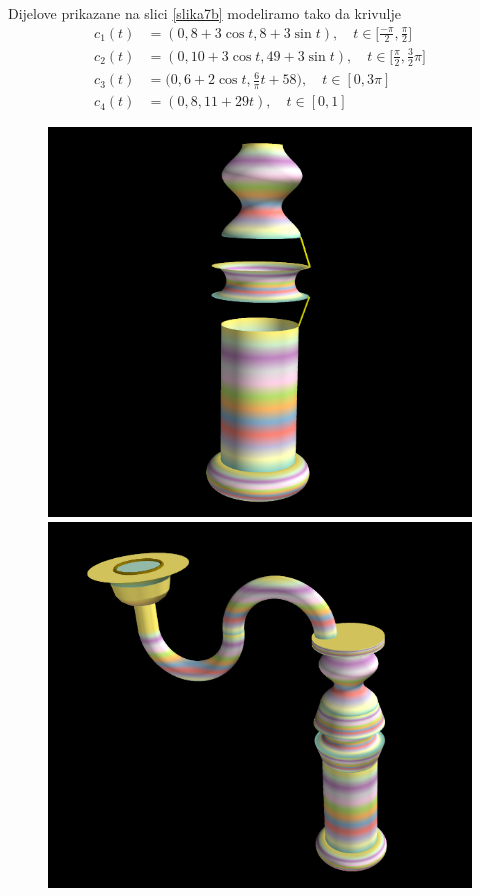 \documentclass[a4paper,12pt]{article}
\theoremstyle{zad}
\begin{document}
Dijelove prikazane na slici \ref{slika7b} modeliramo tako da krivulje
\begin{align*}
c_1(t)&=(0,8+3\cos{t},8+3\sin{t}),\quad t\in\big[\tfrac{-\pi}{2},\tfrac{\pi}{2}\big]\\[5pt]
c_2(t)&=(0,10+3\cos{t},49+3\sin{t}),\quad t\in\big[\tfrac{\pi}{2},\tfrac{3}{2}\pi\big]\\[5pt]
c_3(t)&=\big(0,6+2\cos{t},\tfrac{6}{\pi}t+58\big),\quad t\in[0,3\pi]\\[5pt]
c_4(t)&=(0,8,11+29t),\quad t\in[0,1]
\end{align*}
\begin{figure}[!h]
\centering
\parbox{5cm}{
\includegraphics[scale=0.23]{slika7b.png}
\caption{}
\label{slika7c}}
\qquad
\begin{minipage}{5cm}
\includegraphics[scale=0.23]{slika8.png}
\caption{}
\label{slika8}
\end{minipage}
\end{figure}
\end{document}
